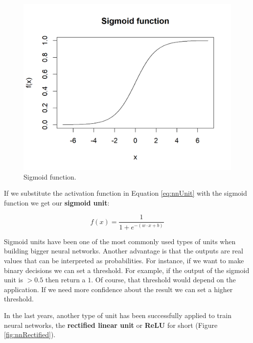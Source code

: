 \documentclass[
  11pt,
]{krantz}
\begin{document}
\begin{figure}

{\centering \includegraphics[width=1\linewidth]{images/nn_sigmoid} 

}

\caption{Sigmoid function.}\label{fig:nnSigmoid}
\end{figure}

If we substitute the activation function in Equation \eqref{eq:nnUnit} with the sigmoid function we get our \textbf{sigmoid unit}:

\begin{equation}
  f(x) = \frac{1}{1 + e^{-(w \cdot x + b)}}
  \label{eq:sigmoidunit}
\end{equation}

Sigmoid units have been one of the most commonly used types of units when building bigger neural networks. Another advantage is that the outputs are real values that can be interpreted as probabilities. For instance, if we want to make binary decisions we can set a threshold. For example, if the output of the sigmoid unit is \(> 0.5\) then return a \(1\). Of course, that threshold would depend on the application. If we need more confidence about the result we can set a higher threshold.

In the last years, another type of unit has been successfully applied to train neural networks, the \textbf{rectified linear unit} or \textbf{ReLU} for short (Figure \ref{fig:nnRectified}).
\end{document}
